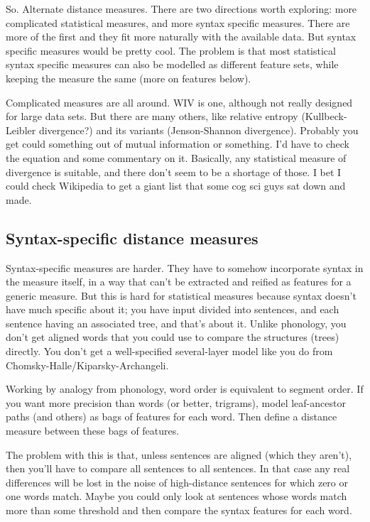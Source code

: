 So. Alternate distance measures. There are two directions worth
exploring: more complicated statistical measures, and more syntax
specific measures. There are more of the first and they fit more
naturally with the available data. But syntax specific measures would
be pretty cool. The problem is that most statistical syntax specific
measures can also be modelled as different feature sets, while keeping
the measure the same (more on features below).

Complicated measures are all around. WIV is one, although not really
designed for large data sets. But there are many others, like relative
entropy (Kullbeck-Leibler divergence?) and its variants
(Jenson-Shannon divergence). Probably you get could something out of
mutual information or something. I'd have to check the equation and
some commentary on it. Basically, any statistical measure of
divergence is suitable, and there don't seem to be a shortage of
those. I bet I could check Wikipedia to get a giant list that some cog
sci guys sat down and made.

\subsection{Syntax-specific distance measures}

Syntax-specific measures are harder. They have to somehow incorporate
syntax in the measure itself, in a way that can't be extracted and
reified as features for a generic measure. But this is hard for
statistical measures because syntax doesn't have much specific about
it; you have input divided into sentences, and each sentence having an
associated tree, and that's about it. Unlike phonology, you don't get
aligned words that you could use to compare the structures (trees)
directly. You don't get a well-specified several-layer model like you
do from Chomsky-Halle/Kiparsky-Archangeli.

Working by analogy from phonology, word order is equivalent to segment
order. If you want more precision than words (or better, trigrams),
model leaf-ancestor paths (and others) as bags of features for each
word. Then define a distance measure between these bags of features.

The problem with this is that, unless sentences are aligned (which
they aren't), then you'll have to compare all sentences to all
sentences. In that case any real differences will be lost in the noise
of high-distance sentences for which zero or one words match. Maybe
you could only look at sentences whose words match more than some
threshold and then compare the syntax features for each word.

